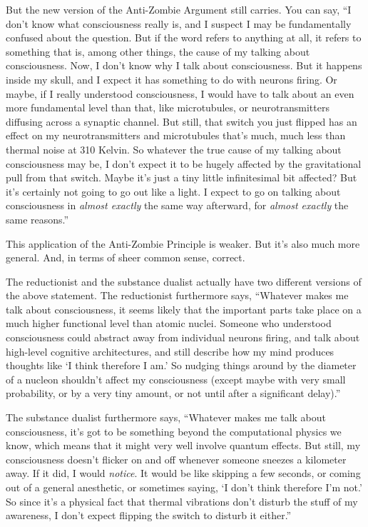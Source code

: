 {
 But the new version of the Anti-Zombie Argument still carries. You
can say, ``I don't know what
consciousness really is, and I suspect I may be fundamentally confused
about the question. But if the word refers to anything at all, it
refers to something that is, among other things, the cause of my
talking about consciousness. Now, I don't know why I
talk about consciousness. But it happens inside my skull, and I expect
it has something to do with neurons firing. Or maybe, if I really
understood consciousness, I would have to talk about an even more
fundamental level than that, like microtubules, or neurotransmitters
diffusing across a synaptic channel. But still, that switch you just
flipped has an effect on my neurotransmitters and microtubules
that's much, much less than thermal noise at 310
Kelvin. So whatever the true cause of my talking about consciousness
may be, I don't expect it to be hugely affected by the
gravitational pull from that switch. Maybe it's just a
tiny little infinitesimal bit affected? But it's
certainly not going to go out like a light. I expect to go on talking
about consciousness in \textit{almost exactly} the same way afterward,
for \textit{almost exactly} the same reasons.''}

{
 This application of the Anti-Zombie Principle is weaker. But
it's also much more general. And, in terms of sheer
common sense, correct.}

{
 The reductionist and the substance dualist actually have two
different versions of the above statement. The reductionist furthermore
says, ``Whatever makes me talk about consciousness, it
seems likely that the important parts take place on a much higher
functional level than atomic nuclei. Someone who understood
consciousness could abstract away from individual neurons firing, and
talk about high-level cognitive architectures, and still describe how
my mind produces thoughts like `I think therefore I
am.' So nudging things around by the diameter of a
nucleon shouldn't affect my consciousness (except maybe
with very small probability, or by a very tiny amount, or not until
after a significant delay).''}

{
 The substance dualist furthermore says,
``Whatever makes me talk about consciousness,
it's got to be something beyond the computational
physics we know, which means that it might very well involve quantum
effects. But still, my consciousness doesn't flicker on
and off whenever someone sneezes a kilometer away. If it did, I would
\textit{notice}. It would be like skipping a few seconds, or coming out
of a general anesthetic, or sometimes saying, `I
don't think therefore I'm
not.' So since it's a physical fact
that thermal vibrations don't disturb the stuff of my
awareness, I don't expect flipping the switch to
disturb it either.''}

